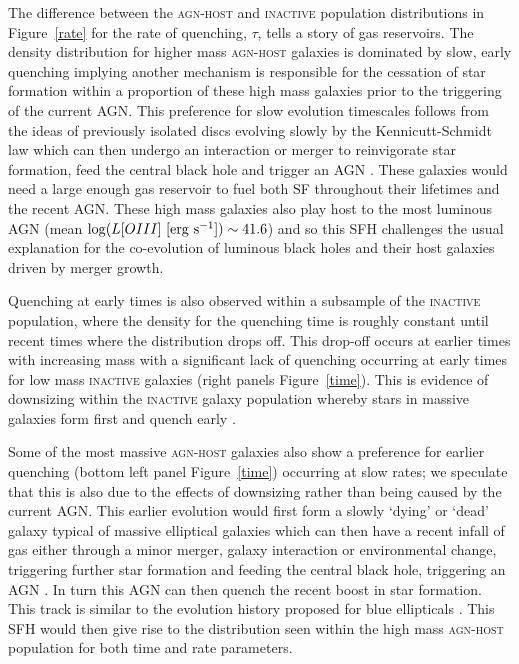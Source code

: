 The difference between the \textsc{agn-host} and \textsc{inactive} population distributions in Figure~\ref{rate} for the rate of quenching, $\tau$, tells a story of gas reservoirs. The density distribution for higher mass \textsc{agn-host} galaxies is dominated by slow, early quenching implying another mechanism is responsible for the cessation of star formation within a proportion of these high mass galaxies prior to the triggering of the current AGN.  This preference for slow evolution timescales follows from the ideas of previously isolated discs evolving slowly by the Kennicutt-Schmidt \citep{Schmidt59, Kennicutt97} law which can then undergo an interaction or merger to reinvigorate star formation, feed the central black hole and trigger an AGN \citep{Varela04, emsellem15}. These galaxies would need a large enough gas reservoir to fuel both SF throughout their lifetimes and the recent AGN. These high mass galaxies also play host to the most luminous AGN (mean $\log (L[OIII] ~[\rm{erg}~s^{-1}]) \sim 41.6$) and so this SFH challenges the usual explanation for the co-evolution of luminous black holes and their host galaxies driven by merger growth. 


Quenching at early times is also observed within a subsample of the \textsc{inactive} population, where the density for the quenching time is roughly constant until recent times where the distribution drops off.  This drop-off occurs at earlier times with increasing mass with a significant lack of quenching occurring at early times for low mass \textsc{inactive} galaxies (right panels Figure~\ref{time}). This is evidence of downsizing within the \textsc{inactive} galaxy population whereby stars in massive galaxies form first and quench early \citep{Cowie96, Thomas10}. 

Some of the most massive \textsc{agn-host} galaxies also show a preference for earlier quenching (bottom left panel Figure~\ref{time}) occurring at slow rates; we speculate that this is also due to the effects of downsizing rather than being caused by the current AGN. This earlier evolution would first form a slowly `dying' or `dead' galaxy typical of massive elliptical galaxies which can then have a recent infall of gas either through a minor merger, galaxy interaction or environmental change, triggering further star formation and feeding the central black hole, triggering an AGN \citep{kaviraj14}. In turn this AGN can then quench the recent boost in star formation. This track is similar to the evolution history proposed for blue ellipticals \citep{Kaviraj13, McIntosh14, Haines15}. This SFH would then give rise to the distribution seen within the high mass \textsc{agn-host} population for both time and rate parameters.


